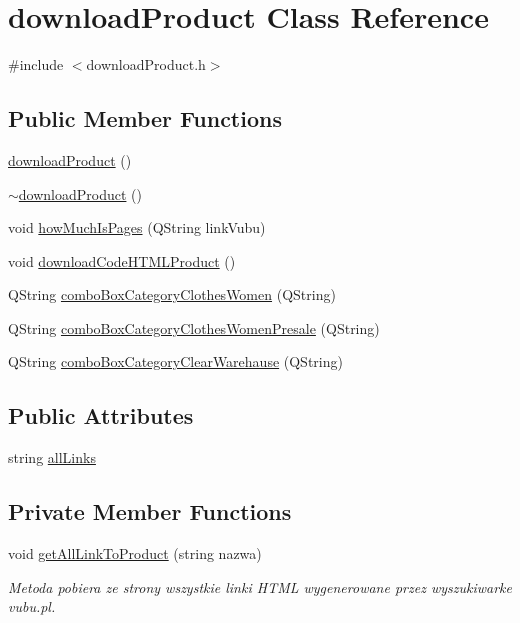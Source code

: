 \hypertarget{classdownload_product}{}\section{download\+Product Class Reference}
\label{classdownload_product}


{\ttfamily \#include $<$download\+Product.\+h$>$}

\subsection*{Public Member Functions}
\begin{DoxyCompactItemize}
\item 
\mbox{\hyperlink{classdownload_product_a0d44eb29a7391d9b4f2412edf7d1ebda}{download\+Product}} ()
\item 
\mbox{\hyperlink{classdownload_product_a606f11fe90d3415abb7a20df5ac4209b}{$\sim$download\+Product}} ()
\item 
void \mbox{\hyperlink{classdownload_product_a383a290dfb6c4916e1e192a61626e364}{how\+Much\+Is\+Pages}} (Q\+String link\+Vubu)
\item 
void \mbox{\hyperlink{classdownload_product_a0c865ae0d258f5e8669cf4a9dc395274}{download\+Code\+H\+T\+M\+L\+Product}} ()
\item 
Q\+String \mbox{\hyperlink{classdownload_product_a31f84f4939cabad7c3150f0ce563d284}{combo\+Box\+Category\+Clothes\+Women}} (Q\+String)
\item 
Q\+String \mbox{\hyperlink{classdownload_product_aa5d985f8ce454e685578d5d574fb02ef}{combo\+Box\+Category\+Clothes\+Women\+Presale}} (Q\+String)
\item 
Q\+String \mbox{\hyperlink{classdownload_product_a2686f055c79460d3ce1735b98df2cd12}{combo\+Box\+Category\+Clear\+Warehause}} (Q\+String)
\end{DoxyCompactItemize}
\subsection*{Public Attributes}
\begin{DoxyCompactItemize}
\item 
string \mbox{\hyperlink{classdownload_product_a96bd93aa922098e2f55180ad5f212479}{all\+Links}}
\end{DoxyCompactItemize}
\subsection*{Private Member Functions}
\begin{DoxyCompactItemize}
\item 
void \mbox{\hyperlink{classdownload_product_a7102ffd5250743cbc9c5e74ea78dc686}{get\+All\+Link\+To\+Product}} (string nazwa)
\begin{DoxyCompactList}\small\item\em Metoda pobiera ze strony wszystkie linki H\+T\+ML wygenerowane przez wyszukiwarke vubu.\+pl. \end{DoxyCompactList}\end{DoxyCompactItemize}
